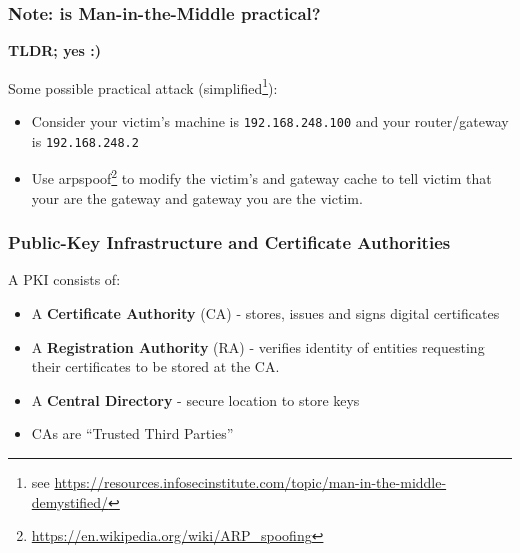\documentclass[
hyperref={pdfpagelabels=false}
,xcolor=table
]
{beamer}
\begin{document}
\begin{frame}
  \frametitle{Note: is Man-in-the-Middle practical?}

  \textbf{TLDR; yes :)}
  
  Some possible practical attack (simplified\footnote{\tiny see
    \url{https://resources.infosecinstitute.com/topic/man-in-the-middle-demystified/}}):

  \begin{itemize}
  \item Consider your victim's machine is \texttt{192.168.248.100} and
    your router/gateway is \texttt{192.168.248.2}
  \item Use
    arpspoof\footnote{\tiny \url{https://en.wikipedia.org/wiki/ARP_spoofing}}
    to modify the victim's and gateway cache to tell victim that your
    are the gateway and gateway you are the victim.
  \end{itemize}


  
\end{frame}





\begin{frame}
  \frametitle{Public-Key Infrastructure and Certificate Authorities}
  A PKI consists of: 
  \begin{itemize}
  \item A \textbf{Certificate Authority} (CA) - stores, issues and signs digital certificates
  \item A \textbf{Registration Authority} (RA) - verifies identity of entities requesting their certificates to be stored at the CA. 
  \item A \textbf{Central Directory} - secure location to store keys 
  \end{itemize}

  \begin{itemize}
  \item CAs are ``Trusted Third Parties''
  \end{itemize}
\end{frame}
\end{document}
